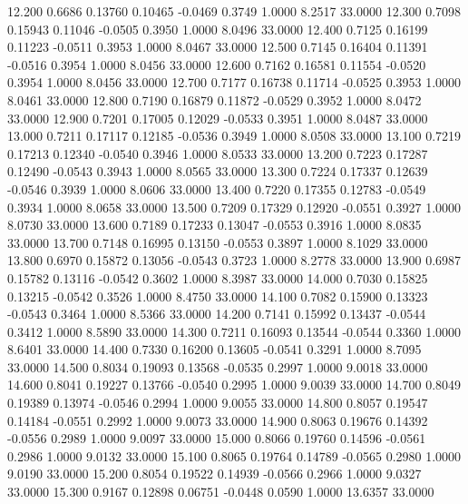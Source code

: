   12.200   0.6686   0.13760   0.10465  -0.0469   0.3749   1.0000   8.2517  33.0000
  12.300   0.7098   0.15943   0.11046  -0.0505   0.3950   1.0000   8.0496  33.0000
  12.400   0.7125   0.16199   0.11223  -0.0511   0.3953   1.0000   8.0467  33.0000
  12.500   0.7145   0.16404   0.11391  -0.0516   0.3954   1.0000   8.0456  33.0000
  12.600   0.7162   0.16581   0.11554  -0.0520   0.3954   1.0000   8.0456  33.0000
  12.700   0.7177   0.16738   0.11714  -0.0525   0.3953   1.0000   8.0461  33.0000
  12.800   0.7190   0.16879   0.11872  -0.0529   0.3952   1.0000   8.0472  33.0000
  12.900   0.7201   0.17005   0.12029  -0.0533   0.3951   1.0000   8.0487  33.0000
  13.000   0.7211   0.17117   0.12185  -0.0536   0.3949   1.0000   8.0508  33.0000
  13.100   0.7219   0.17213   0.12340  -0.0540   0.3946   1.0000   8.0533  33.0000
  13.200   0.7223   0.17287   0.12490  -0.0543   0.3943   1.0000   8.0565  33.0000
  13.300   0.7224   0.17337   0.12639  -0.0546   0.3939   1.0000   8.0606  33.0000
  13.400   0.7220   0.17355   0.12783  -0.0549   0.3934   1.0000   8.0658  33.0000
  13.500   0.7209   0.17329   0.12920  -0.0551   0.3927   1.0000   8.0730  33.0000
  13.600   0.7189   0.17233   0.13047  -0.0553   0.3916   1.0000   8.0835  33.0000
  13.700   0.7148   0.16995   0.13150  -0.0553   0.3897   1.0000   8.1029  33.0000
  13.800   0.6970   0.15872   0.13056  -0.0543   0.3723   1.0000   8.2778  33.0000
  13.900   0.6987   0.15782   0.13116  -0.0542   0.3602   1.0000   8.3987  33.0000
  14.000   0.7030   0.15825   0.13215  -0.0542   0.3526   1.0000   8.4750  33.0000
  14.100   0.7082   0.15900   0.13323  -0.0543   0.3464   1.0000   8.5366  33.0000
  14.200   0.7141   0.15992   0.13437  -0.0544   0.3412   1.0000   8.5890  33.0000
  14.300   0.7211   0.16093   0.13544  -0.0544   0.3360   1.0000   8.6401  33.0000
  14.400   0.7330   0.16200   0.13605  -0.0541   0.3291   1.0000   8.7095  33.0000
  14.500   0.8034   0.19093   0.13568  -0.0535   0.2997   1.0000   9.0018  33.0000
  14.600   0.8041   0.19227   0.13766  -0.0540   0.2995   1.0000   9.0039  33.0000
  14.700   0.8049   0.19389   0.13974  -0.0546   0.2994   1.0000   9.0055  33.0000
  14.800   0.8057   0.19547   0.14184  -0.0551   0.2992   1.0000   9.0073  33.0000
  14.900   0.8063   0.19676   0.14392  -0.0556   0.2989   1.0000   9.0097  33.0000
  15.000   0.8066   0.19760   0.14596  -0.0561   0.2986   1.0000   9.0132  33.0000
  15.100   0.8065   0.19764   0.14789  -0.0565   0.2980   1.0000   9.0190  33.0000
  15.200   0.8054   0.19522   0.14939  -0.0566   0.2966   1.0000   9.0327  33.0000
  15.300   0.9167   0.12898   0.06751  -0.0448   0.0590   1.0000  13.6357  33.0000

